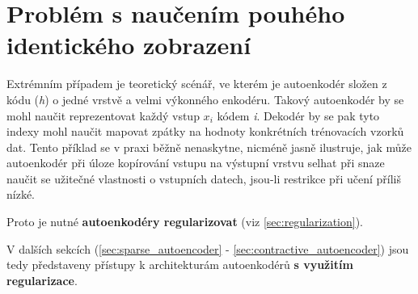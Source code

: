 \section{Problém s naučením pouhého identického zobrazení}
\label{sec:identity}
Extrémním případem je teoretický scénář, ve kterém je autoenkodér složen z kódu (\emph{h}) o jedné vrstvě a velmi výkonného enkodéru.
Takový autoenkodér by se mohl naučit reprezentovat každý vstup $x_i$ kódem \emph{i}.
Dekodér by se pak tyto indexy mohl naučit mapovat zpátky na hodnoty konkrétních trénovacích vzorků dat.
Tento příklad se v praxi běžně nenaskytne, nicméně jasně ilustruje,
jak může autoenkodér při úloze kopírování vstupu na výstupní vrstvu selhat při snaze naučit se užitečné vlastnosti o vstupních datech, jsou-li restrikce při učení příliš nízké. \cite{Goodfellow2016}

Proto je nutné \textbf{autoenkodéry regularizovat} (viz \autoref{sec:regularization}).

V dalších sekcích (\autoref{sec:sparse_autoencoder} - \autoref{sec:contractive_autoencoder}) jsou tedy představeny přístupy k architekturám autoenkodérů \textbf{s využitím regularizace}.
